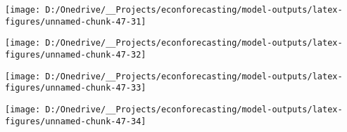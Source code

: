 \documentclass[11pt, letterpaper]{article}\usepackage[]{graphicx}\usepackage[]{color}
\begin{document}
{\centering \texttt{[image: D:/Onedrive/\_\_Projects/econforecasting/model-outputs/latex-figures/unnamed-chunk-47-31]} 

}




{\centering \texttt{[image: D:/Onedrive/\_\_Projects/econforecasting/model-outputs/latex-figures/unnamed-chunk-47-32]} 

}




{\centering \texttt{[image: D:/Onedrive/\_\_Projects/econforecasting/model-outputs/latex-figures/unnamed-chunk-47-33]} 

}




{\centering \texttt{[image: D:/Onedrive/\_\_Projects/econforecasting/model-outputs/latex-figures/unnamed-chunk-47-34]} 

}
\end{document}
